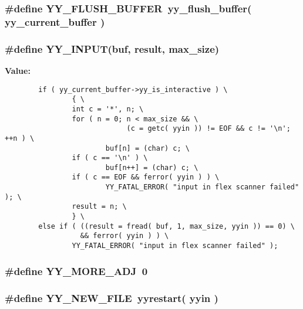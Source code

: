 \subsubsection{\setlength{\rightskip}{0pt plus 5cm}\#define YY\_\-FLUSH\_\-BUFFER\ yy\_\-flush\_\-buffer( yy\_\-current\_\-buffer )}\label{pplexer_8c_a40}


\subsubsection{\setlength{\rightskip}{0pt plus 5cm}\#define YY\_\-INPUT(buf, result, max\_\-size)}\label{pplexer_8c_a70}


{\bf Value:}\footnotesize\begin{verbatim}        if ( yy_current_buffer->yy_is_interactive ) \
                { \
                int c = '*', n; \
                for ( n = 0; n < max_size && \
                             (c = getc( yyin )) != EOF && c != '\n'; ++n ) \
                        buf[n] = (char) c; \
                if ( c == '\n' ) \
                        buf[n++] = (char) c; \
                if ( c == EOF && ferror( yyin ) ) \
                        YY_FATAL_ERROR( "input in flex scanner failed" ); \
                result = n; \
                } \
        else if ( ((result = fread( buf, 1, max_size, yyin )) == 0) \
                  && ferror( yyin ) ) \
                YY_FATAL_ERROR( "input in flex scanner failed" );
\end{verbatim}\normalsize 
{}
\subsubsection{\setlength{\rightskip}{0pt plus 5cm}\#define YY\_\-MORE\_\-ADJ\ 0}\label{pplexer_8c_a51}


\subsubsection{\setlength{\rightskip}{0pt plus 5cm}\#define YY\_\-NEW\_\-FILE\ yyrestart( yyin )}\label{pplexer_8c_a28}


